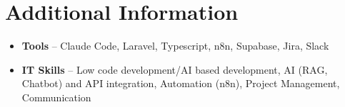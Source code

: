 \documentclass[a4paper,10pt]{article}
\begin{document}
\section{Additional Information}
\begin{itemize}
\item \textbf{Tools} -- Claude Code, Laravel, Typescript, n8n, Supabase, Jira, Slack
\item \textbf{IT Skills} -- Low code development/AI based development, AI (RAG, Chatbot) and API integration, Automation (n8n), Project Management, Communication
\end{itemize}
\end{document}
